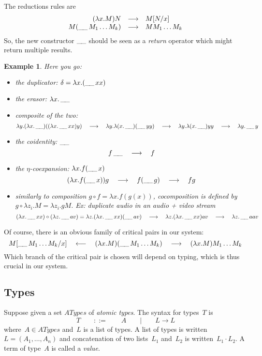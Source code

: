 \documentclass[a4paper,titlepage]{article}
\newcommand{\ATypes}{ATypes}
\newcommand{\ret}{\mathop{\_\hspace{-.3ex}\_}}
\newtheorem{example}[theorem]{Example}
\begin{document}
The reductions rules are
\[
\begin{array}{r@{\quad}c@{\quad}l}
  (\lambda x.M)N&\longrightarrow&M[N/x]\\
  M(\ret M_1\ldots M_k)&\longrightarrow&MM_1\ldots M_k\\
\end{array}
\]
So, the new constructor $\ret$ should be seen as a \emph{return} operator which
might return multiple results.

\begin{example}
  Here you go:
  \begin{itemize}
  \item the duplicator: $\delta=\lambda x.(\ret xx)$
  \item the erasor: $\lambda x.\ret$
  \item composite of the two:
    \[
    \lambda y.(\lambda x.\ret)((\lambda x.\ret xx)y)
    \quad\longrightarrow\quad
    \lambda y.\lambda(x.\ret)(\ret yy)
    \quad\longrightarrow\quad
    \lambda y.\lambda(x.\ret)yy
    \quad\longrightarrow\quad
    \lambda y.\ret y
    \]
  \item the coidentity: $\ret$
    \[
    f\ret\quad\longrightarrow\quad f
    \]
  \item the $\eta$-coexpansion: $\lambda x.f(\ret x)$
    \[
    (\lambda x.f(\ret x))g
    \quad\longrightarrow\quad
    f(\ret g)
    \quad\longrightarrow\quad
    fg
    \]
  \item similarly to composition $g\circ f=\lambda x.f(g(x))$, cocomposition is
    defined by $g\circ \lambda z_i.M=\lambda z_i.g M$. Ex: duplicate audio in an
    audio + video stream
    \[
    (\lambda x.\ret x x)\circ(\lambda z.\ret a v)
    =
    \lambda z.(\lambda x.\ret xx)(\ret av)
    \quad\longrightarrow\quad
    \lambda z.(\lambda x.\ret xx)av
    \quad\longrightarrow\quad
    \lambda z.\ret aav
    \]
  \end{itemize}
\end{example}

Of course, there is an obvious family of critical pairs in our system:
\[
M[\ret M_1\ldots M_k/x]
\quad\longleftarrow\quad
(\lambda x.M)(\ret M_1\ldots M_k)
\quad\longrightarrow\quad
(\lambda x.M)M_1\ldots M_k
\]
Which branch of the critical pair is chosen will depend on typing, which is thus
crucial in our system.

\subsection{Types}
Suppose given a set $\ATypes$ of \emph{atomic types}. The syntax for types~$T$ is
\[
T
\qquad::=\qquad
A
\qquad|\qquad
L\to L
\]
where~$A\in\ATypes$ and~$L$ is a list of types. A list of types is written
\hbox{$L=(A_1,\ldots,A_n)$} and concatenation of two lists~$L_1$ and~$L_2$ is
written~$L_1\cdot L_2$. A term of type~$A$ is called a \emph{value}.
\end{document}
